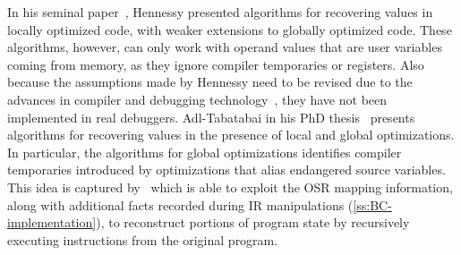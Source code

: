 In his seminal paper~\cite{Hennessy82}, Hennessy presented algorithms for recovering values in locally optimized code, with weaker extensions to globally optimized code. These algorithms, however, can only work with operand values that are user variables coming from memory, as they ignore compiler temporaries or registers. Also because the assumptions made by Hennessy need to be revised due to the advances in compiler and debugging technology~\cite{Copperman93}, they have not been implemented in real debuggers. Adl-Tabatabai in his PhD thesis~\cite{Adl-Tabatabai96thesis} presents algorithms for recovering values in the presence of local and global optimizations. In particular, the algorithms for global optimizations identifies compiler temporaries introduced by optimizations that alias endangered source variables. This idea is captured by \buildcomp\, which is able to exploit the OSR mapping information, along with additional facts recorded during IR manipulations (\mysection\ref{ss:BC-implementation}), to reconstruct portions of program state by recursively executing instructions from the original program.